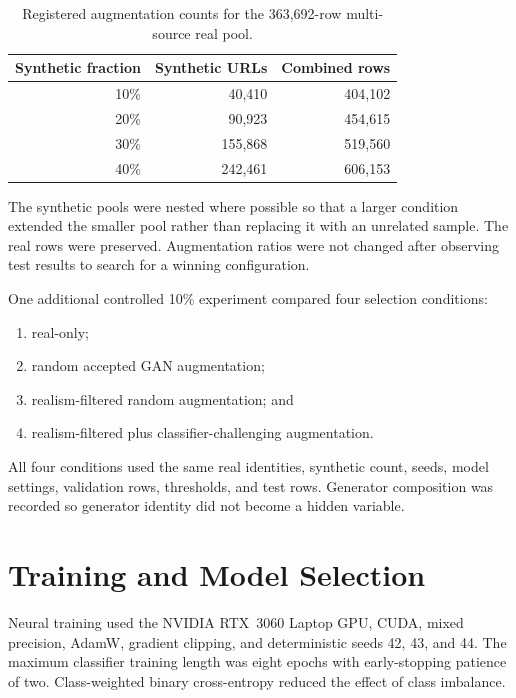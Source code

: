 \begin{table}[htbp]
\centering
\caption{Registered augmentation counts for the 363,692-row multi-source real pool.}
\label{tab:method-augmentation-counts}
\begin{tabular}{@{}rrr@{}}
\toprule
Synthetic fraction & Synthetic URLs & Combined rows \\
\midrule
10\% & 40,410 & 404,102 \\
20\% & 90,923 & 454,615 \\
30\% & 155,868 & 519,560 \\
40\% & 242,461 & 606,153 \\
\bottomrule
\end{tabular}
\end{table}

The synthetic pools were nested where possible so that a larger condition
extended the smaller pool rather than replacing it with an unrelated sample.
The real rows were preserved. Augmentation ratios were not changed after
observing test results to search for a winning configuration.

One additional controlled 10\% experiment compared four selection conditions:

\begin{enumerate}
    \item real-only;
    \item random accepted GAN augmentation;
    \item realism-filtered random augmentation; and
    \item realism-filtered plus classifier-challenging augmentation.
\end{enumerate}

All four conditions used the same real identities, synthetic count, seeds,
model settings, validation rows, thresholds, and test rows. Generator
composition was recorded so generator identity did not become a hidden
variable.

\section{Training and Model Selection}

Neural training used the NVIDIA RTX~3060 Laptop GPU, CUDA, mixed precision,
AdamW, gradient clipping, and deterministic seeds 42, 43, and 44. The maximum
classifier training length was eight epochs with early-stopping patience of two.
Class-weighted binary cross-entropy reduced the effect of class imbalance.

